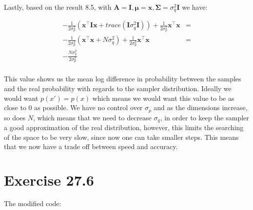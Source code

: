\documentclass[11pt,a4paper,oneside]{report}
\begin{document}
Lastly, based on the result 8.5, with $\mathbf{A}=\mathbf{I},\mathbf{\mu}=\mathbf{x},\mathbf{\Sigma}=\sigma_q^2\mathbf{I}$ we have:

\begin{align*}
-\frac{1}{2\sigma_p^2} \left( \mathbf{x}^\top\mathbf{I}\mathbf{x}+ trace(\mathbf{I}\sigma_q^2\mathbf{I}) \right)+ \frac{1}{2\sigma_p^2}\mathbf{x}^\top\mathbf{x} &=\\
-\frac{1}{2\sigma_p^2} \left( \mathbf{x}^\top\mathbf{x}+ N\sigma_q^2 \right)+ \frac{1}{2\sigma_p^2}\mathbf{x}^\top\mathbf{x} &=\\
-\frac{N\sigma_q^2}{2\sigma_p^2} &\\
\end{align*}

This value shows us the mean log difference in probability between the samples and the real probability with regards to the sampler distribution. Ideally we would want $p(x')=p(x)$ which means we would want this value to be as close to 0 as possible. We have no control over $\sigma_p$ and as the dimensions increase, so does $N$, which means that we need to decrease $\sigma_q$, in order to keep the sampler a good approximation of the real distribution, however, this limits the searching of the space to be very slow, since now one can take smaller steps. This means that we now have a trade off between speed and accuracy.

\section*{Exercise 27.6}

The modified code:
\end{document}

